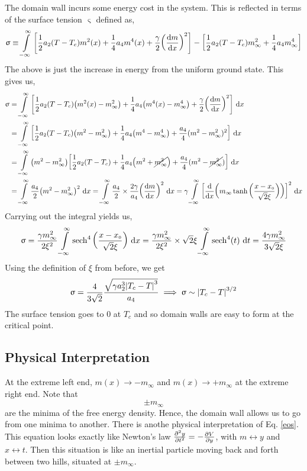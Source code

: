 The domain wall incurs some energy cost in the system. This is reflected in terms of the surface tension $\upvarsigma$ defined as,
\begin{equation}
    \upvarsigma \equiv \int\limits_{-\infty}^\infty \qty[\frac{1}{2}a_2(T-T_c) m^2(x) + \frac{1}{4}a_4m^4(x) + \frac{\gamma}{2}\qty(\dv{m}{x})^2] -\qty[\frac{1}{2}a_2(T-T_c) m_\infty^2 + \frac{1}{4}a_4m^4_\infty] 
\end{equation}
The above is just the increase in energy from the uniform ground state. This gives us, 
\begin{align}
    \begin{split}
        \upvarsigma &= \int\limits_{-\infty}^\infty \qty[\frac{1}{2}a_2(T-T_c) \qty(m^2(x)-m_\infty^2) + \frac{1}{4}a_4\qty(m^4(x)-m^4_\infty) + \frac{\gamma}{2}\qty(\dv{m}{x})^2]\ \dd x \\
        &=\int\limits_{-\infty}^\infty \qty[\frac{1}{2}a_2(T-T_c) \qty(m^2-m_\infty^2) + \frac{1}{4}a_4\qty(m^4-m^4_\infty) + \frac{a_4}{4}(m^2-m_\infty^2)^2]\ \dd x\\
        &=\int\limits_{-\infty}^\infty \qty(m^2-m_\infty^2) \qty[\frac{1}{2}a_2(T-T_c)  + \frac{1}{4}a_4\qty(m^2+\cancel{m^2_\infty}) + \frac{a_4}{4}(m^2-\cancel{m_\infty^2})]\ \dd x\\
        &=\int\limits_{-\infty}^\infty\frac{a_4}{2} \qty(m^2-m_\infty^2)^2\ \dd x = \int\limits_{-\infty}^\infty\frac{a_4}{2} \times \frac{2\gamma}{a_4} \qty(\dv{m}{x})^2\ \dd x = \gamma \int\limits_{-\infty}^\infty \qty[\dv{x} \qty(m_\infty \tanh\qty(\frac{x-x_{\text{\tiny 0}}}{\sqrt{2}\xi}))]^2\ \dd x
    \end{split}
\end{align}
Carrying out the integral yields us,
\begin{align*}
    \upvarsigma = \frac{\gamma m_\infty^2}{2\xi^2}  \int\limits_{-\infty}^\infty \sech^4\qty(\frac{x-x\tund{0}}{\sqrt{2}\xi})\ \dd x = \frac{\gamma m_\infty^2}{2\xi^2}\times \sqrt{2}\xi  \int\limits_{-\infty}^\infty \sech^4(t)\ \dd t = \frac{4\gamma m_\infty^2}{3\sqrt{2}\xi}
\end{align*}
Using the definition of $\xi$ from before, we get 
\begin{equation}
    \upvarsigma =\frac{4}{3\sqrt{2}} \frac{\sqrt{\gamma a_2^3 \abs{T_c-T}^3}}{a_4}  \implies \upvarsigma \sim \abs{T_c-T}^{3/2}
\end{equation}
The surface tension goes to $0$ at $T_c$ and so domain walls are easy to form at the critical point. 
\subsection{Physical Interpretation}
At the extreme left end, $m(x)\to -m_\infty$ and $m(x)\to +m_\infty$ at the extreme right end. Note that $$\pm m_\infty$$ are the minima of the free energy density. Hence, the domain wall allows us to go from one minima to another. There is anothe physical interpretation of Eq. \eqref{eos}. This equation looks exactly like Newton's law $\pdv[2]{y}{t} = -\pdv{V}{y}$, with $m \leftrightarrow y$ and $x\leftrightarrow t$. Then this situation is like an inertial particle moving back and forth between two hills, situated at $\pm m_\infty$.
